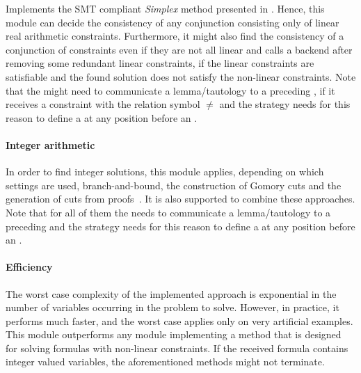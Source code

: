 Implements the SMT compliant \emph{Simplex} method presented in \cite{DM06}.
Hence, this module can decide the consistency of any conjunction
consisting only of linear real arithmetic constraints. Furthermore,
it might also find the consistency of a conjunction of constraints
even if they are not all linear and calls a backend after removing
some redundant linear constraints, if the linear constraints are satisfiable
and the found solution does not satisfy the non-linear constraints. Note that the 
\lraModuleClass might need to communicate a lemma/tautology to a preceding 
\satModuleClass, if it receives a constraint with the relation symbol $\neq$
 and the strategy needs for this reason to define a \satModuleClass at any 
 position before an \lraModuleClass.

\paragraph{Integer arithmetic} In order to find integer solutions, this
module applies, depending on which settings are used, branch-and-bound,
the construction of Gomory cuts and the generation of cuts from 
proofs~\cite{DilligDA11}. It is also supported to combine these approaches. Note that
for all of them the \lraModuleClass needs to communicate a lemma/tautology to a
preceding \satModuleClass and the strategy needs for this reason to define a 
\satModuleClass at any position before an \lraModuleClass.

\paragraph{Efficiency} The worst case complexity of the implemented
approach is exponential in the number of variables occurring in the
problem to solve. However, in practice, it performs much faster, and
the worst case applies only on very artificial examples. This module
outperforms any module implementing a method that is designed for 
solving formulas with non-linear constraints. If the received formula
contains integer valued variables, the aforementioned methods might not
terminate.